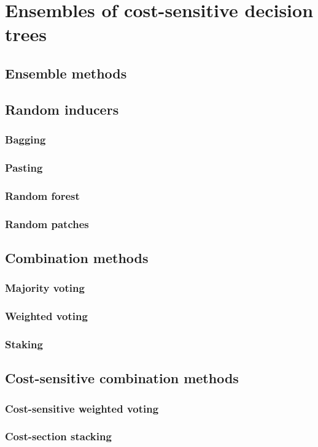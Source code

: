 \documentclass[twoside,openright,titlepage,numbers=noenddot,headinclude,%
               footinclude=true,cleardoublepage=empty,abstractoff,BCOR=5mm,%
               paper=a4,fontsize=12pt,ngerman,american]{scrreprt}
\numberwithin{theorem}{chapter}
\numberwithin{definition}{chapter}
\numberwithin{algorithm}{chapter}
\numberwithin{figure}{chapter}
\numberwithin{table}{chapter}
\numberwithin{equation}{chapter}
\begin{document}
		
	\chapter{Ensembles of cost-sensitive decision trees}
		\section{Ensemble methods}
			\section{Random inducers}
				\subsection{Bagging}
				\subsection{Pasting}
				\subsection{Random forest}
				\subsection{Random patches}
			\section{Combination methods}
				\subsection{Majority voting}
				\subsection{Weighted voting}
				\subsection{Staking}
		\section{Cost-sensitive combination methods}
			\subsection{Cost-sensitive weighted voting}
			\subsection{Cost-section stacking}
\end{document}
